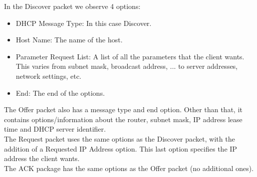 In the Discover packet we observe 4 options: 
\begin{itemize}
	\item DHCP Message Type: In this case Discover.
	\item Host Name: The name of the host.
	\item Parameter Request List: A list of all the parameters that the client wants. This varies from subnet mask, broadcast address, ... to server addresses, network settings, etc.
	\item End: The end of the options.
\end{itemize}

The Offer packet also has a message type and end option. Other than that, it contains options/information about the router, subnet mask, IP address lease time and DHCP server identifier. \\

The Request packet uses the same options as the Discover packet, with the addition of a Requested IP Address option. This last option specifies the IP address the client wants. \\

The ACK package has the same options as the Offer packet (no additional ones).
